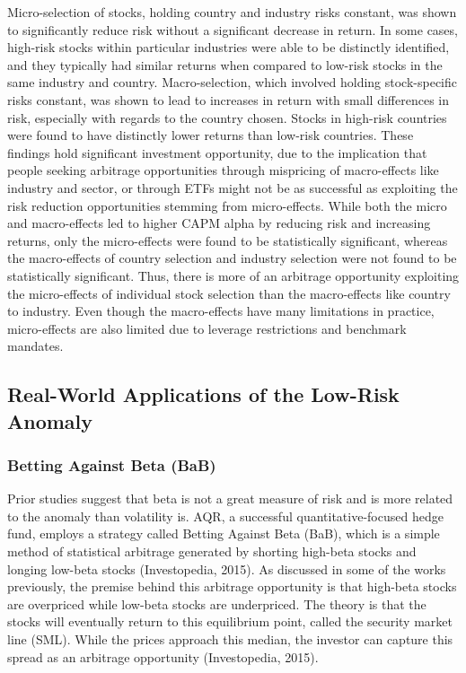 \documentclass[12pt,twoside]{reedthesis}
\theoremstyle{definition}
\theoremstyle{definition}
\theoremstyle{definition}
\theoremstyle{remark}
\begin{document}
Micro-selection of stocks, holding country and industry risks constant,
was shown to significantly reduce risk without a significant decrease in
return. In some cases, high-risk stocks within particular industries
were able to be distinctly identified, and they typically had similar
returns when compared to low-risk stocks in the same industry and
country. Macro-selection, which involved holding stock-specific risks
constant, was shown to lead to increases in return with small
differences in risk, especially with regards to the country chosen.
Stocks in high-risk countries were found to have distinctly lower
returns than low-risk countries. These findings hold significant
investment opportunity, due to the implication that people seeking
arbitrage opportunities through mispricing of macro-effects like
industry and sector, or through ETFs might not be as successful as
exploiting the risk reduction opportunities stemming from micro-effects.
While both the micro and macro-effects led to higher CAPM alpha by
reducing risk and increasing returns, only the micro-effects were found
to be statistically significant, whereas the macro-effects of country
selection and industry selection were not found to be statistically
significant. Thus, there is more of an arbitrage opportunity exploiting
the micro-effects of individual stock selection than the macro-effects
like country to industry. Even though the macro-effects have many
limitations in practice, micro-effects are also limited due to leverage
restrictions and benchmark mandates.

\subsection{Real-World Applications of the Low-Risk
Anomaly}\label{real-world-applications-of-the-low-risk-anomaly}

\subsubsection{Betting Against Beta
(BaB)}\label{betting-against-beta-bab}

Prior studies suggest that beta is not a great measure of risk and is
more related to the anomaly than volatility is. AQR, a successful
quantitative-focused hedge fund, employs a strategy called Betting
Against Beta (BaB), which is a simple method of statistical arbitrage
generated by shorting high-beta stocks and longing low-beta stocks
(Investopedia, 2015). As discussed in some of the works previously, the
premise behind this arbitrage opportunity is that high-beta stocks are
overpriced while low-beta stocks are underpriced. The theory is that the
stocks will eventually return to this equilibrium point, called the
security market line (SML). While the prices approach this median, the
investor can capture this spread as an arbitrage opportunity
(Investopedia, 2015).
\end{document}
